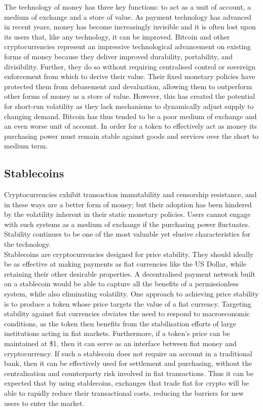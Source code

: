 \noindent The technology of money has three key functions: to act as a unit
of account, a medium of exchange and a store of value. As payment technology
has advanced in recent years, money has become increasingly invisible and it
is often lost upon its users that, like any technology, it can be improved.
Bitcoin and other cryptocurrencies represent an impressive technological
advancement on existing forms of money because they deliver improved
durability, portability, and divisibility. Further, they do so without
requiring centralised control or sovereign enforcement from which to derive
their value. Their fixed monetary policies have protected them from
debasement and devaluation, allowing them to outperform other forms of money
as a store of value. However, this has created the potential for short-run
volatility as they lack mechanisms to dynamically adjust supply to changing
demand. Bitcoin has thus tended to be a poor medium of exchange and an even
worse unit of account. In order for a token to effectively act as money its
purchasing power must remain stable against goods and services over the
short to medium term.


\subsection{Stablecoins}

\noindent Cryptocurrencies exhibit transaction immutability and censorship
resistance, and in these ways are a better form of money; but their adoption
has been hindered by the volatility inherent in their static monetary
policies. Users cannot engage with such systems as a medium of exchange if
the purchasing power fluctuates. Stability continues to be one of the most
valuable yet elusive characteristics for the technology. \\

\noindent Stablecoins are cryptocurrencies designed for price stability. They
should ideally be as effective at making payments as fiat currencies like the
US Dollar, while retaining their other desirable properties. A decentralised
payment network built on a stablecoin would be able to capture all the
benefits of a permissionless system, while also eliminating volatility. One
approach to achieving price stability is to produce a token whose price
targets the value of a fiat currency. Targeting stability against fiat
currencies obviates the need to respond to macroeconomic conditions, as the
token then benefits from the stabilisation efforts of large institutions
acting in fiat markets. Furthermore, if a token’s price can be maintained at
\$1, then it can serve as an interface between fiat money and cryptocurrency.
If such a stablecoin does not require an account in a traditional bank, then
it can be effectively used for settlement and purchasing, without the
centralisation and counterparty risk involved in fiat transactions. Thus it
can be expected that by using stablecoins, exchanges that trade fiat for
crypto will be able to rapidly reduce their transactional costs, reducing the
barriers for new users to enter the market.

